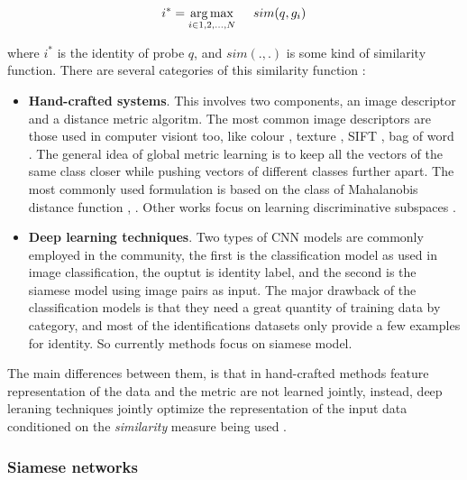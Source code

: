 \documentclass[12pt, a4paper, titlepage,twoside,openright]{article}
\begin{document}

$$ i^{*} = \underset{i \in 1,2,...,N}{\arg\max} \hspace{0.5cm} sim(q,g_{i}) $$

where $i^{*}$ is the identity of probe $q$, and $sim( . , . )$ is some kind of similarity function. There are several categories of this similarity function \cite{pastPresent}:

\begin{itemize}
 
\item \textbf{Hand-crafted systems}. This involves two components, an image descriptor and a distance metric algoritm. The most common image descriptors are those used in computer visiont too, like colour \cite{lbp}, texture \cite{pairwise}, SIFT \cite{sift}, bag of word \cite{bagword}. The general idea of global metric learning is to keep all the vectors of the same class closer while pushing vectors of different classes further apart. The most commonly used formulation is based on the class of Mahalanobis distance function \cite{kiisme}, \cite{lnnn}. Other works focus on learning discriminative subspaces \cite{lda}.

\item \textbf{Deep learning techniques}. Two types of CNN models are commonly employed in the community, the first is the classification model as used in image classification, the ouptut is identity label, and the second is the siamese model using image pairs as input. The major drawback of the classification models is that they need a great quantity of training data by category, and most of the identifications datasets only provide a few examples for identity. So currently methods focus on siamese model.

\end{itemize} 

The main differences between them, is that in hand-crafted methods feature representation of the data and the metric are not learned jointly, instead, deep leraning techniques jointly optimize the representation of the input data conditioned on the \textit{similarity} measure being used \cite{EC1}. 





\subsubsection{Siamese networks}
\end{document}
